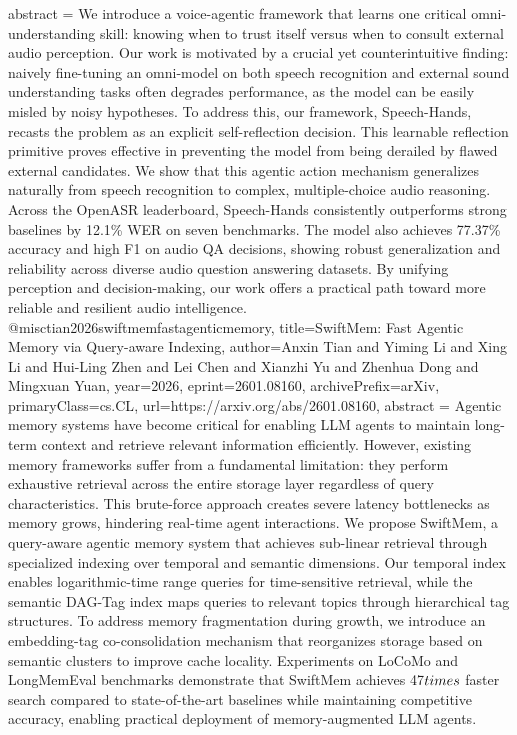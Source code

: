 {      abstract = {We introduce a voice-agentic framework that learns one critical omni-understanding skill: knowing when to trust itself versus when to consult external audio perception. Our work is motivated by a crucial yet counterintuitive finding: naively fine-tuning an omni-model on both speech recognition and external sound understanding tasks often degrades performance, as the model can be easily misled by noisy hypotheses. To address this, our framework, Speech-Hands, recasts the problem as an explicit self-reflection decision. This learnable reflection primitive proves effective in preventing the model from being derailed by flawed external candidates. We show that this agentic action mechanism generalizes naturally from speech recognition to complex, multiple-choice audio reasoning. Across the OpenASR leaderboard, Speech-Hands consistently outperforms strong baselines by 12.1\% WER on seven benchmarks. The model also achieves 77.37\% accuracy and high F1 on audio QA decisions, showing robust generalization and reliability across diverse audio question answering datasets. By unifying perception and decision-making, our work offers a practical path toward more reliable and resilient audio intelligence.}
}@misc{tian2026swiftmemfastagenticmemory,
      title={SwiftMem: Fast Agentic Memory via Query-aware Indexing}, 
      author={Anxin Tian and Yiming Li and Xing Li and Hui-Ling Zhen and Lei Chen and Xianzhi Yu and Zhenhua Dong and Mingxuan Yuan},
      year={2026},
      eprint={2601.08160},
      archivePrefix={arXiv},
      primaryClass={cs.CL},
      url={https://arxiv.org/abs/2601.08160},
      abstract = {Agentic memory systems have become critical for enabling LLM agents to maintain long-term context and retrieve relevant information efficiently. However, existing memory frameworks suffer from a fundamental limitation: they perform exhaustive retrieval across the entire storage layer regardless of query characteristics. This brute-force approach creates severe latency bottlenecks as memory grows, hindering real-time agent interactions. We propose SwiftMem, a query-aware agentic memory system that achieves sub-linear retrieval through specialized indexing over temporal and semantic dimensions. Our temporal index enables logarithmic-time range queries for time-sensitive retrieval, while the semantic DAG-Tag index maps queries to relevant topics through hierarchical tag structures. To address memory fragmentation during growth, we introduce an embedding-tag co-consolidation mechanism that reorganizes storage based on semantic clusters to improve cache locality. Experiments on LoCoMo and LongMemEval benchmarks demonstrate that SwiftMem achieves 47$\\times$ faster search compared to state-of-the-art baselines while maintaining competitive accuracy, enabling practical deployment of memory-augmented LLM agents.}
}

